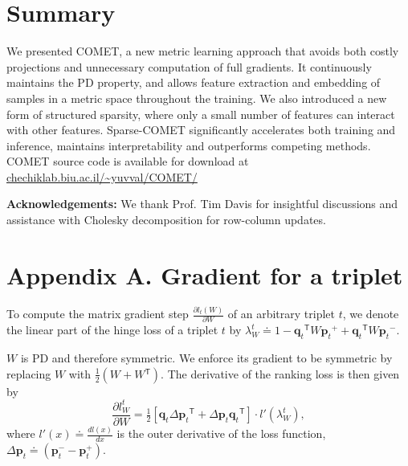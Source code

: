 \documentclass[twoside,11pt]{article}
\newcommand\mat[1]{{#1}}
\renewcommand\vec[1]{\mathbf{#1}}
\newcommand{\T}{{}^\mathsf{T}}
\newcommand{\W}{\mat{W}}
\newcommand{\eqdef}{\doteq}
\newcommand{\q}{{\vec{q}}}
\newcommand{\p}{{\vec{p}}}
\newcommand{\trip}{{t}}
\newcommand{\qt}{{\q_{\trip}}}
\newcommand{\pt}{{\p_{\trip}}}
\begin{document}
\vspace{-6pt}
\section{Summary}\vskip -5pt
We presented COMET, a new metric learning approach that avoids both costly projections and unnecessary computation of full gradients. It continuously maintains the PD property, and allows feature extraction and embedding of samples in a metric space throughout the training. We also introduced a new form of structured sparsity, where only a small number of features can interact with other features. Sparse-COMET significantly accelerates both training and inference, maintains interpretability and outperforms competing methods. COMET source code is available for download at \url{chechiklab.biu.ac.il/~yuvval/COMET/}

\newpage

{\bf Acknowledgements:} We thank Prof. Tim Davis for insightful discussions and assistance with Cholesky decomposition for row-column updates.

\appendix
\section*{Appendix A. Gradient for a triplet}
\label{appendix-grad}
To compute the matrix gradient step $\frac{\partial {l_t (\W)}}{\partial \W}$ of an arbitrary triplet $t$, we denote the linear part of the hinge loss of a triplet $t$ by $\lambda_{W}^t \eqdef 
1-\qt\T \W \pt^{+} + \qt\T\W\pt^{-}.$

$\W$ is PD and therefore symmetric. We enforce its gradient to be symmetric by replacing $\W$ with $\tfrac{1}{2}(\W + \W\T)$. The derivative of the ranking loss is then given by
\begin{equation}
  \frac{\partial {l_{\W}^{t}}}{\partial \W} = \tfrac{1}{2}[\vec{q}_{t}\Delta\vec{p}_{t}\T  + \Delta\vec{p}_{t}\vec{q}_{t}\T]\cdot {l'}(\lambda_{W}^t),
  \label{dlossranking} \nonumber 
\end{equation}
where $l'(x) \eqdef \frac{d{l(x)}}{dx}$ is the outer derivative of the loss function, $\Delta\vec{p}_{t} \eqdef (\vec{p}_{t}^{-} - \vec{p}_{t}^{+})$.

\end{document}
